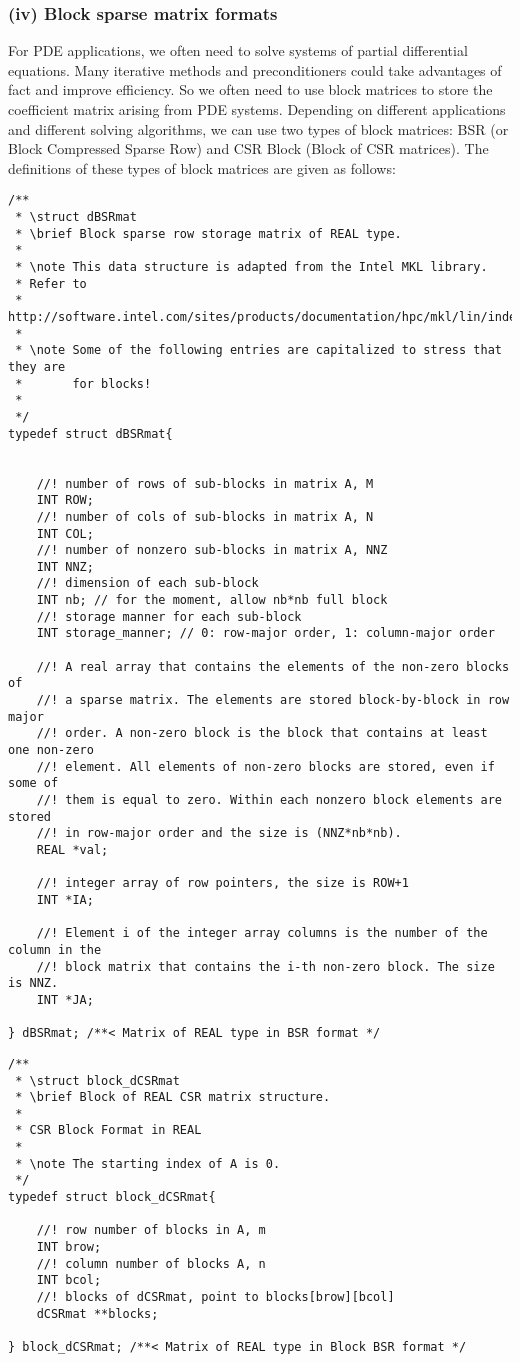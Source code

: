 \documentclass[11pt]{memoir}
\begin{document}
\subsubsection*{(iv) Block sparse matrix formats}

For PDE applications, we often need to solve systems of partial differential equations. Many iterative methods and preconditioners could take advantages of fact and improve efficiency. So we often need to use block matrices to store the coefficient matrix arising from PDE systems. Depending on different applications and different solving algorithms, we can use two types of block matrices: BSR (or Block Compressed Sparse Row) and CSR Block (Block of CSR matrices). The definitions of these types of block matrices are given as follows:

\begin{lstlisting}
/** 
 * \struct dBSRmat
 * \brief Block sparse row storage matrix of REAL type.
 *
 * \note This data structure is adapted from the Intel MKL library. 
 * Refer to 
 * http://software.intel.com/sites/products/documentation/hpc/mkl/lin/index.htm
 *
 * \note Some of the following entries are capitalized to stress that they are 
 *       for blocks!
 *
 */
typedef struct dBSRmat{
	
    
	//! number of rows of sub-blocks in matrix A, M
	INT ROW;
	//! number of cols of sub-blocks in matrix A, N
	INT COL;
	//! number of nonzero sub-blocks in matrix A, NNZ
	INT NNZ;
	//! dimension of each sub-block
	INT nb; // for the moment, allow nb*nb full block 
	//! storage manner for each sub-block           
	INT storage_manner; // 0: row-major order, 1: column-major order
	
	//! A real array that contains the elements of the non-zero blocks of 
	//! a sparse matrix. The elements are stored block-by-block in row major 
	//! order. A non-zero block is the block that contains at least one non-zero 
	//! element. All elements of non-zero blocks are stored, even if some of 
	//! them is equal to zero. Within each nonzero block elements are stored 
	//! in row-major order and the size is (NNZ*nb*nb). 
	REAL *val;
	
	//! integer array of row pointers, the size is ROW+1
	INT *IA;
	
	//! Element i of the integer array columns is the number of the column in the
	//! block matrix that contains the i-th non-zero block. The size is NNZ.
	INT *JA;
	
} dBSRmat; /**< Matrix of REAL type in BSR format */
\end{lstlisting}
%
\begin{lstlisting}
/** 
 * \struct block_dCSRmat
 * \brief Block of REAL CSR matrix structure.
 *
 * CSR Block Format in REAL
 *
 * \note The starting index of A is 0.  
 */
typedef struct block_dCSRmat{
	
	//! row number of blocks in A, m
	INT brow;   
	//! column number of blocks A, n
	INT bcol;   
	//! blocks of dCSRmat, point to blocks[brow][bcol]
	dCSRmat **blocks;
	
} block_dCSRmat; /**< Matrix of REAL type in Block BSR format */
\end{lstlisting}
%
\end{document}
